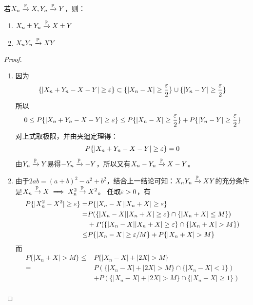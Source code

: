 \begin{lemma}\label{lem:sum_product_CP}
    若$X_n \xrightarrow{\P} X, Y_n \xrightarrow{\P} Y$，则：
    \begin{enumerate}
        \item $X_n \pm Y_n \xrightarrow{\P} X \pm Y$
        \item $X_n Y_n \xrightarrow{\P} XY$
    \end{enumerate}
\end{lemma}
\begin{proof}
    \begin{enumerate}
        \item 因为
              \[ \{ \left\vert X_n+Y_n-X-Y \right\vert \ge \e \} \subset \{ \left\vert X_n-X \right\vert \ge \frac{\e}{2} \} \cup \{ \left\vert Y_n-Y \right\vert \ge \frac{\e}{2} \} \]
              所以
              \[ 0 \le P\{ \left\vert X_n+Y_n-X-Y \right\vert \ge \e \} \le P\{ \left\vert X_n-X \right\vert \ge \frac{\e}{2} \} + P\{ \left\vert Y_n-Y \right\vert \ge \frac{\e}{2} \} \]
              对上式取极限，并由夹逼定理得：
              \[ P\{ \left\vert X_n+Y_n-X-Y \right\vert \ge \e \}=0 \]
              由$Y_n \xrightarrow{\P} Y$易得$-Y_n \xrightarrow{\P} -Y$，所以又有$X_n - Y_n \xrightarrow{\P} X - Y$。
        \item 由于$2ab=(a+b)^2-a^2+b^2$，结合上一结论可知：$X_n Y_n \xrightarrow{\P} XY$的充分条件是$X_n \xrightarrow{\P} X \implies X_n^2 \xrightarrow{\P} X^2$。
              任取$\e >0$，有
              \begin{align*}
                  P\{|X_n^2-X^2| \ge \e \}= & P\{|X_n-X||X_n+X| \ge \e \}                         \\
                  =                         & P(\{|X_n-X||X_n+X| \ge \e \} \cap\{|X_n+X| \le M\}) \\
                                            & + P(\{|X_n-X||X_n+X| \ge \e \} \cap \{|X_n+X|>M\})  \\
                  \le                       & P\{|X_n-X| \ge \e / M\}+P\{|X_n+X|>M\}
              \end{align*}
              而
              \begin{align*}
                  P\{|X_n+X|>M\} \le & P\{|X_n-X|+|2X|>M\}                           \\
                  =                  & P(\{|X_n-X|+|2X|>M\} \cap\{|X_n-X|<1\})       \\
                                     & + P(\{|X_n-X|+|2X|>M\} \cap\{|X_n-X| \ge 1\}) \\

\end{align*}
\end{enumerate}
\end{proof}
